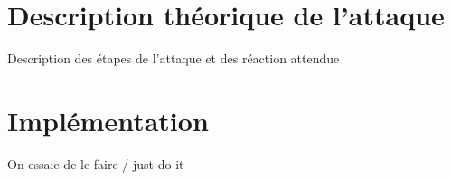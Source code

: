 \section{Description théorique de l'attaque}

Description des étapes de l'attaque et des réaction attendue

\section{Implémentation}

On essaie de le faire / just do it
